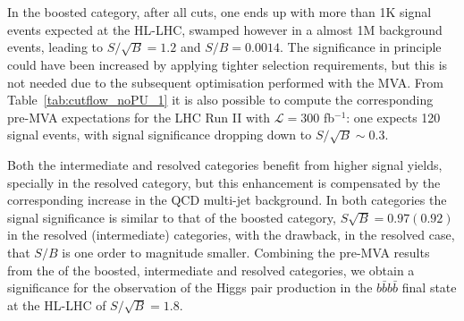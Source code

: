 \begin{table}[t]
  \centering
  \scriptsize
  
  $\,$ \\
  \vspace{0.5cm}
  
  $\,$ \\
  \vspace{0.5cm}
    
    \caption{\small The cross-sections, in femtobarns,
      for the signal and the various background
      processes at different steps of the
      cut-flow, for the resolved (upper table),
      intermediate (middle table) and boosted
      (lower table) categories, for the analysis
      without PU.
      In each case, we also provide the signal over
      background ratio, $S/B$, and the signal
      significance, $S/\sqrt{B}$, considering either
      the total background or only the $4b$ component, for
      a total integrated luminosity of $\mathcal{L}=3$ ab$^{-1}$.
      The different levels of the cut-flow are summarized
      in Table~\ref{tab:cutflowdetails}.
 \label{tab:cutflow_noPU_1}}
\end{table}



%
In the boosted category, after all cuts,
one ends
up with more than 1K signal events expected
at the HL-LHC, swamped  however in a almost 1M background events,
leading to $S/\sqrt{B}=1.2$ and $S/B=0.0014$.
%
The significance in principle could have been increased
by applying tighter selection requirements,
but this is not needed due to the subsequent
optimisation  performed with the MVA.
%
From  Table~\ref{tab:cutflow_noPU_1}
it is also possible to compute the corresponding pre-MVA
expectations for the LHC Run II with
$\mathcal{L}=300$ fb$^{-1}$: one expects
120 signal events, with signal significance dropping down to
$S/\sqrt{B}\sim 0.3$.
%

Both the intermediate and resolved categories benefit from higher signal yields,
specially in the resolved category, but this enhancement is compensated by the
corresponding
increase in the QCD multi-jet background.
%
In both categories
the signal significance is similar to that of the boosted category,
$S\sqrt{B}=0.97(0.92)$ in the resolved
(intermediate) categories,
with the drawback, in the resolved case,
that $S/B$
is one order to magnitude smaller.
%
Combining the pre-MVA results
from the
of the boosted, intermediate and resolved categories,
we obtain a significance for the observation of the Higgs pair production
in the $b\bar{b}b\bar{b}$ final
state at the HL-LHC of  $S/\sqrt{B}=1.8$.

